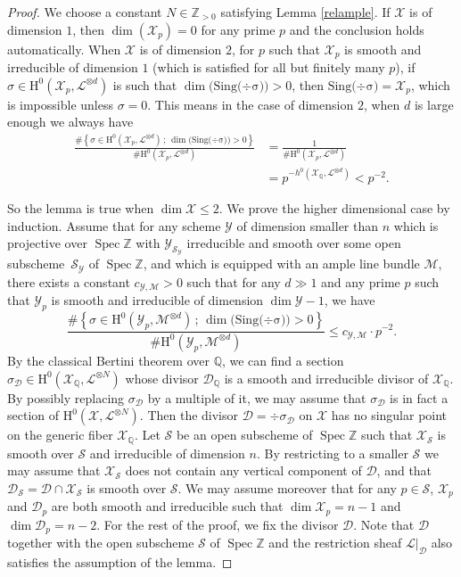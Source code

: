 \documentclass[11pt]{article}
\numberwithin{equation}{section}
\newcommand{\sep}{\,;\,}
\theoremstyle{plain}
\theoremstyle{definition}
\newcommand{\ho}{\mathrm{H}}
\newcommand{\X}{\mathcal{X}}
\newcommand{\li}{\mathcal{L}}
\newcommand{\Q}{\mathbb{Q}}
\newcommand{\Z}{\mathbb{Z}}
\DeclareMathOperator{\Spec}{Spec}
\begin{document}
\begin{proof}
We choose a constant $N\in \Z_{>0}$ satisfying Lemma \ref{relample}. If $\X$ is of dimension $1$, then $\dim(\X_p)=0$ for any prime $p$ and the conclusion holds automatically. When $\X$ is of dimension $2$, for $p$ such that $\X_p$ is smooth and irreducible of dimension $1$ (which is satisfied for all but finitely many $p$), if $\sigma\in \ho^0(\X_p, \li^{\otimes d})$ is such that $\dim\big(\mathrm{Sing(\div \sigma})\big)>0$, then $\mathrm{Sing(\div \sigma})=\X_p$, which is impossible unless $\sigma=0$. This means in the case of dimension $2$, when $d$ is large enough we always have
\begin{align*}
\frac{\#\left\{ \sigma\in \ho^0(\X_p, \li^{\otimes d})\sep \dim\big(\mathrm{Sing(\div \sigma})\big)>0 \right\}}{\#\ho^0(\X_p, \li^{\otimes d})}&=\frac{1}{\#\ho^0(\X_p, \li^{\otimes d})}\\
&=p^{-h^0(\X_{\Q},\li^{\otimes d})}<p^{-2}.
\end{align*}

So the lemma is true when $\dim \X\leq 2$. We prove the higher dimensional case by induction. Assume that for any scheme $\mathcal{Y}$ of dimension smaller than $n$ which is projective over $\Spec \Z$ with $\mathcal{Y}_{\mathcal{S}_{\mathcal{Y}}}$ irreducible and smooth over some open subscheme~$\mathcal{S}_{\mathcal{Y}}$ of $\Spec \Z$, and which is equipped with an ample line bundle $\mathcal{M}$, there exists a constant $c_{\mathcal{Y},\mathcal{M}}>0$ such that for any $d\gg 1$ and any prime $p$ such that $\mathcal{Y}_p$ is smooth and irreducible of dimension $\dim\mathcal{Y}-1$, we have
\[
\frac{\#\left\{ \sigma\in \ho^0(\mathcal{Y}_p, \mathcal{M}^{\otimes d})\sep \dim\big(\mathrm{Sing(\div \sigma})\big)>0 \right\}}{\#\ho^0(\mathcal{Y}_p, \mathcal{M}^{\otimes d})}\leq c_{\mathcal{Y},\mathcal{M}}\cdot p^{-2}.
\]
By the classical Bertini theorem over $\Q$, we can find a section $\sigma_{\mathcal{D}}\in \ho^0(\X_{\Q}, \li^{\otimes N})$ whose divisor $\mathcal D_{\Q}$ is a smooth and irreducible divisor of $\X_{\Q}$. By possibly replacing $\sigma_{\mathcal D}$ by a multiple of it, we may assume that $\sigma_{\mathcal D}$ is in fact a section of $ \ho^0(\X, \li^{\otimes N})$. Then the divisor $\mathcal{D}=\div \sigma_{\mathcal{D}}$ on $\X$ has no singular point on the generic fiber $\X_{\Q}$. Let $\mathcal{S}$ be an open subscheme of $\Spec \Z$ such that $\X_{\mathcal{S}}$ is smooth over $\mathcal{S}$ and irreducible of dimension $n$. By restricting to a smaller $\mathcal{S}$ we may assume that $\X_{\mathcal{S}}$ does not contain any vertical component of $\mathcal{D}$, and that $\mathcal{D}_{\mathcal{S}}=\mathcal{D}\cap \X_{\mathcal{S}}$ is smooth over $\mathcal{S}$. We may assume moreover that for any $p\in \mathcal{S}$, $\X_p$ and $\mathcal{D}_p$ are both smooth and irreducible such that $\dim\X_p=n-1$ and $\dim\mathcal{D}_p=n-2$. For the rest of the proof, we fix the divisor $\mathcal{D}$. Note that $\mathcal{D}$ together with the open subscheme $\mathcal{S}$ of $\Spec \Z$ and the restriction sheaf $\li|_{\mathcal{D}}$ also satisfies the assumption of the lemma.


\end{proof}
\end{document}
